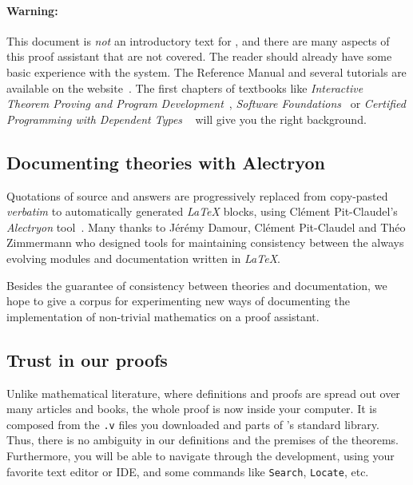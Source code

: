 \documentclass[a4paper]{book}
\begin{document}
\paragraph*{Warning:}

This document is \emph{not} an introductory text for \coq{}, and there are many aspects of this proof assistant that are not covered. 
 The reader should already have some basic experience with the \coq{} system. The Reference Manual and several tutorials are available on the \coq{} website~\cite{Coq}. The first chapters of textbooks like \emph{Interactive Theorem Proving and Program Development}~\cite{BC04}, \emph{Software Foundations}~\cite{SF} or  \emph{Certified Programming with Dependent Types} ~\cite{chlipalacpdt2011} will give you the right background.


 
\subsection{Documenting theories with Alectryon}

Quotations of \coq{} source and answers are progressively replaced from copy-pasted \emph{verbatim} to automatically generated \emph{LaTeX} blocks, using Clément Pit-Claudel's \emph{Alectryon} tool~\cite{alectryonpaper, alectryongithub}.
Many thanks to Jérémy Damour, Clément Pit-Claudel  and Théo Zimmermann who designed tools for maintaining consistency between the always evolving \coq{} modules and documentation written in \emph{LaTeX}.

Besides the guarantee of consistency between theories and documentation, we hope to give a corpus for experimenting new ways of documenting the implementation of non-trivial mathematics on a proof assistant.

\subsection{Trust in our proofs}
\label{sect:trust-in-proofs}

Unlike mathematical literature, where definitions and proofs are spread out over many articles and books,
the whole proof is now inside your computer. It is composed from the \texttt{.v} files you downloaded and
parts of \coq's standard library. Thus, there is no ambiguity in our definitions and the premises of the theorems. Furthermore, you will be able to navigate through the development, using your favorite text editor or IDE, and some commands like \texttt{Search}, \texttt{Locate},  etc.
\end{document}

